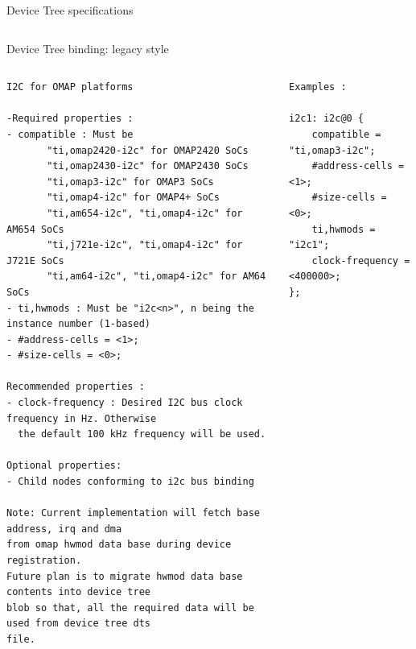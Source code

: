 \begin{frame}{Device Tree specifications}
\begin{columns}
  \end{columns}
\end{frame}

\begin{frame}[fragile]{Device Tree binding: legacy style}
  \begin{center}
  \end{center}
  \begin{columns}[t]
    \begin{block}{}
      {\fontsize{5}{6}\selectfont
\begin{verbatim}
I2C for OMAP platforms

-Required properties :
- compatible : Must be
       "ti,omap2420-i2c" for OMAP2420 SoCs
       "ti,omap2430-i2c" for OMAP2430 SoCs
       "ti,omap3-i2c" for OMAP3 SoCs
       "ti,omap4-i2c" for OMAP4+ SoCs
       "ti,am654-i2c", "ti,omap4-i2c" for AM654 SoCs
       "ti,j721e-i2c", "ti,omap4-i2c" for J721E SoCs
       "ti,am64-i2c", "ti,omap4-i2c" for AM64 SoCs
- ti,hwmods : Must be "i2c<n>", n being the instance number (1-based)
- #address-cells = <1>;
- #size-cells = <0>;

Recommended properties :
- clock-frequency : Desired I2C bus clock frequency in Hz. Otherwise
  the default 100 kHz frequency will be used.

Optional properties:
- Child nodes conforming to i2c bus binding

Note: Current implementation will fetch base address, irq and dma
from omap hwmod data base during device registration.
Future plan is to migrate hwmod data base contents into device tree
blob so that, all the required data will be used from device tree dts
file.
\end{verbatim}
      }
    \end{block}
    \begin{block}{}
      {\fontsize{4}{5}\selectfont
\begin{verbatim}
Examples :

i2c1: i2c@0 {
    compatible = "ti,omap3-i2c";
    #address-cells = <1>;
    #size-cells = <0>;
    ti,hwmods = "i2c1";
    clock-frequency = <400000>;
};
\end{verbatim}
      }
    \end{block}
  \end{columns}

\end{frame}

